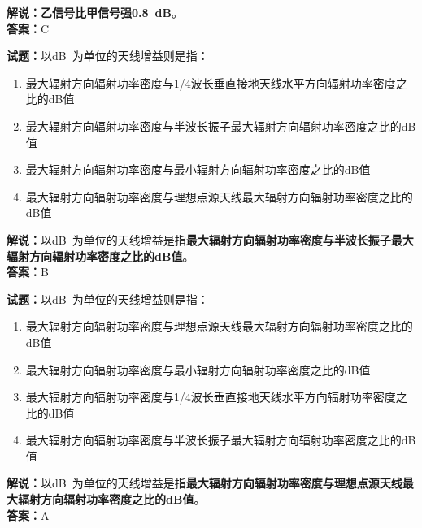 \documentclass{ctexbook}
\begin{document}
\noindent\textbf{解说：乙信号比甲信号强\qty{0.8}{\dB}}。\\\noindent\textbf{答案：}C

\vspace{\baselineskip}

\noindent\textbf{试题：}以\unit[qualifier-mode=combine]{\deci\bel{}}为单位的天线增益则是指：

\begin{enumerate}[leftmargin=3em]
  \item 最大辐射方向辐射功率密度与1/4波长垂直接地天线水平方向辐射功率密度之比的\si{\dB}值
  \item 最大辐射方向辐射功率密度与半波长振子最大辐射方向辐射功率密度之比的\si{\dB}值
  \item 最大辐射方向辐射功率密度与最小辐射方向辐射功率密度之比的\si{\dB}值
  \item 最大辐射方向辐射功率密度与理想点源天线最大辐射方向辐射功率密度之比的\si{\dB}值
\end{enumerate}

\noindent\textbf{解说：}以\unit[qualifier-mode=combine]{\deci\bel{}}为单位的天线增益是指\textbf{最大辐射方向辐射功率密度与半波长振子最大辐射方向辐射功率密度之比的\si{\dB}值}。\\\noindent\textbf{答案：}B

\vspace{\baselineskip}

\noindent\textbf{试题：}以\unit[qualifier-mode=combine]{\deci\bel{}}为单位的天线增益则是指：
\begin{enumerate}[leftmargin=3em]
  \item 最大辐射方向辐射功率密度与理想点源天线最大辐射方向辐射功率密度之比的\si{\dB}值
  \item 最大辐射方向辐射功率密度与最小辐射方向辐射功率密度之比的\si{\dB}值
  \item 最大辐射方向辐射功率密度与1/4波长垂直接地天线水平方向辐射功率密度之比的\si{\dB}值
  \item 最大辐射方向辐射功率密度与半波长振子最大辐射方向辐射功率密度之比的\si{\dB}值
\end{enumerate}

\noindent\textbf{解说：}以\unit[qualifier-mode=combine]{\deci\bel{}}为单位的天线增益是指\textbf{最大辐射方向辐射功率密度与理想点源天线最大辐射方向辐射功率密度之比的\si{\dB}值}。\\\noindent\textbf{答案：}A

\vspace{\baselineskip}
\end{document}
